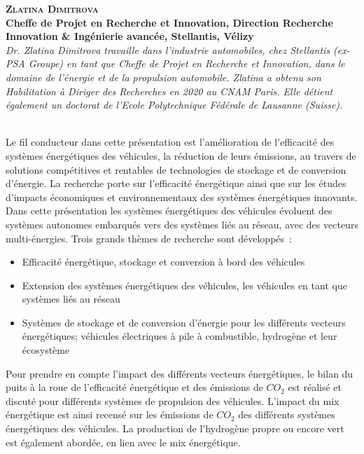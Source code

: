 \hspace{0.04\linewidth}\vrule\hspace{0.01\linewidth}\parbox{0.88\linewidth}{
\textbf{{\scshape Zlatina Dimitrova}\\ Cheffe de Projet en Recherche et Innovation, Direction Recherche Innovation \& Ingénierie avancée, Stellantis, Vélizy}\\
{\slshape Dr. Zlatina Dimitrova travaille dans l’industrie automobiles, chez Stellantis (ex-PSA Groupe) en tant que Cheffe de Projet en Recherche et Innovation, dans le domaine de l’énergie et de la propulsion automobile. Zlatina a obtenu son Habilitation à Diriger des Recherches en 2020 au CNAM Paris. Elle détient également un doctorat de l’Ecole Polytechnique Fédérale de Lausanne (Suisse).}}\\[2ex]

\vspace{1cm}
Le fil conducteur dans cette présentation est l'amélioration de l'efficacité des systèmes énergétiques des véhicules, la réduction de leurs émissions, au travers de solutions compétitives et rentables de technologies de stockage et de conversion d'énergie. La recherche porte sur l'efficacité énergétique ainsi que sur les études d'impacts économiques et environnementaux des systèmes énergétiques innovants. Dans cette présentation les systèmes énergétiques des véhicules évoluent des systèmes autonomes embarqués vers des systèmes liés au réseau, avec des vecteurs multi-énergies. Trois grands thèmes de recherche sont développés : 
\begin{itemize}[label=\textbullet]
    \item Efficacité énergétique, stockage et conversion à bord des véhicules
    \item Extension des systèmes énergétiques des véhicules, les véhicules en tant que systèmes liés au réseau
    \item Systèmes de stockage et de conversion d'énergie pour les différents vecteurs énergétiques; véhicules électriques à pile à combustible, hydrogène et leur écosystème
\end{itemize}
Pour prendre en compte l'impact des différents vecteurs énergétiques, le bilan du puits à la roue de l'efficacité énergétique et des émissions de $\unit{CO_2}$ est réalisé et discuté pour différents systèmes de propulsion des véhicules. L’impact du mix énergétique est ainsi recensé sur les émissions de $\unit{CO_2}$ des différents systèmes énergétiques des véhicules. La production de l’hydrogène propre ou encore vert est également abordée, en lien avec le mix énergétique. 


